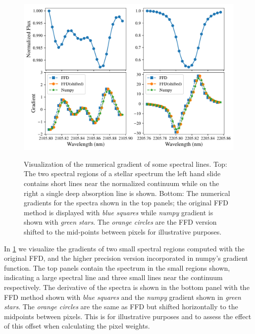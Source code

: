 \begin{figure}
    \centering
    \includegraphics[width=0.8\linewidth]{figures/information-content/spectral_gradients}\\
    \caption[Comparing of numerical gradient alogithms.]{Visualization of the numerical gradient of some spectral lines.
        Top: The two spectral regions of a stellar spectrum the left hand slide contains short lines near the normalized continuum while on the right a single deep absorption line is shown.
        Bottom: The numerical gradients for the spectra shown in the top panels; the original {FFD} method is displayed with \emph{blue squares} while \emph{numpy} gradient is shown with \emph{green stars}.
        The \emph{orange circles} are the {FFD} version shifted to the mid-points between pixels for illustrative purposes.}
    \label{fig:gradients}
\end{figure}




In \cref{fig:gradients} we visualize the gradients of two small spectral regions computed with the original {FFD}, and the higher precision version incorporated in numpy's gradient function.
The top panels contain the spectrum in the small regions shown, indicating a large spectral line and three small lines near the continuum respectively.
The derivative of the spectra is shown in the bottom panel with the {FFD} method shown with \emph{blue squares} and the \emph{numpy} gradient shown in \emph{green stars}.
The \emph{orange circles} are the same as {FFD} but shifted horizontally to the midpoints between pixels.
This is for illustrative purposes and to assess the effect of this offset when calculating the pixel weights.

